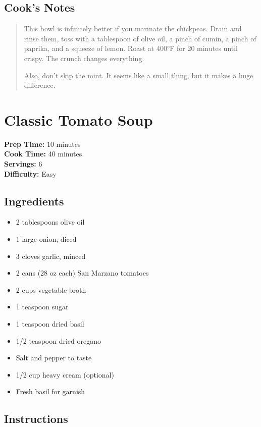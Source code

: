 \documentclass[
    language=english,
    doctype=recipe-book,
    institution=none,
]{../../omnilatex}
\begin{document}
\subsection*{Cook's Notes}
\begin{quote}
This bowl is infinitely better if you marinate the chickpeas. Drain and rinse them, toss with a tablespoon of olive oil, a pinch of cumin, a pinch of paprika, and a squeeze of lemon. Roast at 400°F for 20 minutes until crispy. The crunch changes everything.

Also, don't skip the mint. It seems like a small thing, but it makes a huge difference.
\end{quote}

\section*{Classic Tomato Soup}

\begin{recipebox}
\textbf{Prep Time:} 10 minutes\\
\textbf{Cook Time:} 40 minutes\\
\textbf{Servings:} 6\\
\textbf{Difficulty:} Easy
\end{recipebox}

\subsection*{Ingredients}

\begin{itemize}
    \item 2 tablespoons olive oil
    \item 1 large onion, diced
    \item 3 cloves garlic, minced
    \item 2 cans (28 oz each) San Marzano tomatoes
    \item 2 cups vegetable broth
    \item 1 teaspoon sugar
    \item 1 teaspoon dried basil
    \item 1/2 teaspoon dried oregano
    \item Salt and pepper to taste
    \item 1/2 cup heavy cream (optional)
    \item Fresh basil for garnish
\end{itemize}

\subsection*{Instructions}
\end{document}
